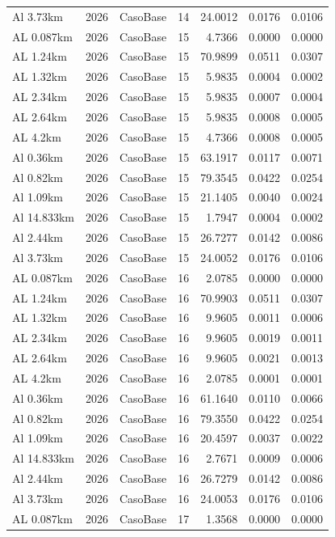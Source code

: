 \documentclass[11pt,a4paper]{article}
\begin{document}
\begin{longtable}{llllrrr}
Al 3.73km & 2026 & CasoBase & 14 & 24.0012 & 0.0176 & 0.0106 \\
AL 0.087km & 2026 & CasoBase & 15 & 4.7366 & 0.0000 & 0.0000 \\
AL 1.24km & 2026 & CasoBase & 15 & 70.9899 & 0.0511 & 0.0307 \\
AL 1.32km & 2026 & CasoBase & 15 & 5.9835 & 0.0004 & 0.0002 \\
AL 2.34km & 2026 & CasoBase & 15 & 5.9835 & 0.0007 & 0.0004 \\
AL 2.64km & 2026 & CasoBase & 15 & 5.9835 & 0.0008 & 0.0005 \\
AL 4.2km & 2026 & CasoBase & 15 & 4.7366 & 0.0008 & 0.0005 \\
Al 0.36km & 2026 & CasoBase & 15 & 63.1917 & 0.0117 & 0.0071 \\
Al 0.82km & 2026 & CasoBase & 15 & 79.3545 & 0.0422 & 0.0254 \\
Al 1.09km & 2026 & CasoBase & 15 & 21.1405 & 0.0040 & 0.0024 \\
Al 14.833km & 2026 & CasoBase & 15 & 1.7947 & 0.0004 & 0.0002 \\
Al 2.44km & 2026 & CasoBase & 15 & 26.7277 & 0.0142 & 0.0086 \\
Al 3.73km & 2026 & CasoBase & 15 & 24.0052 & 0.0176 & 0.0106 \\
AL 0.087km & 2026 & CasoBase & 16 & 2.0785 & 0.0000 & 0.0000 \\
AL 1.24km & 2026 & CasoBase & 16 & 70.9903 & 0.0511 & 0.0307 \\
AL 1.32km & 2026 & CasoBase & 16 & 9.9605 & 0.0011 & 0.0006 \\
AL 2.34km & 2026 & CasoBase & 16 & 9.9605 & 0.0019 & 0.0011 \\
AL 2.64km & 2026 & CasoBase & 16 & 9.9605 & 0.0021 & 0.0013 \\
AL 4.2km & 2026 & CasoBase & 16 & 2.0785 & 0.0001 & 0.0001 \\
Al 0.36km & 2026 & CasoBase & 16 & 61.1640 & 0.0110 & 0.0066 \\
Al 0.82km & 2026 & CasoBase & 16 & 79.3550 & 0.0422 & 0.0254 \\
Al 1.09km & 2026 & CasoBase & 16 & 20.4597 & 0.0037 & 0.0022 \\
Al 14.833km & 2026 & CasoBase & 16 & 2.7671 & 0.0009 & 0.0006 \\
Al 2.44km & 2026 & CasoBase & 16 & 26.7279 & 0.0142 & 0.0086 \\
Al 3.73km & 2026 & CasoBase & 16 & 24.0053 & 0.0176 & 0.0106 \\
AL 0.087km & 2026 & CasoBase & 17 & 1.3568 & 0.0000 & 0.0000 \\

\end{longtable}
\end{document}
